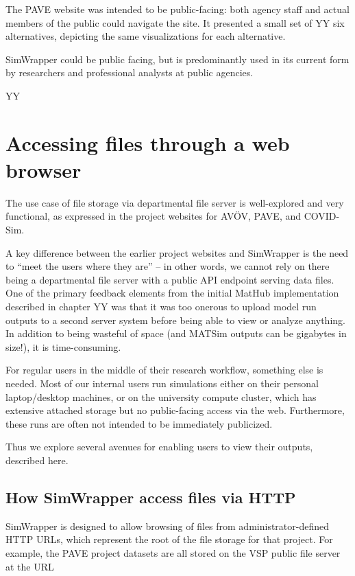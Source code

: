 The PAVE website was intended to be public-facing: both agency staff and
actual members of the public could navigate the site. It presented a
small set of YY six alternatives, depicting the same visualizations for
each alternative.

SimWrapper could be public facing, but is predominantly used in its
current form by researchers and professional analysts at public
agencies.

YY

\hypertarget{accessing-files-through-a-web-browser}{%
\section{Accessing files through a web
browser}\label{accessing-files-through-a-web-browser}}

The use case of file storage via departmental file server is
well-explored and very functional, as expressed in the project websites
for AVÖV, PAVE, and COVID-Sim.

A key difference between the earlier project websites and SimWrapper is
the need to ``meet the users where they are'' -- in other words, we
cannot rely on there being a departmental file server with a public API
endpoint serving data files. One of the primary feedback elements from
the initial MatHub implementation described in chapter YY was that it
was too onerous to upload model run outputs to a second server system
before being able to view or analyze anything. In addition to being
wasteful of space (and MATSim outputs can be gigabytes in size!), it is
time-consuming.

For regular users in the middle of their research workflow, something
else is needed. Most of our internal users run simulations either on
their personal laptop/desktop machines, or on the university compute
cluster, which has extensive attached storage but no public-facing
access via the web. Furthermore, these runs are often not intended to be
immediately publicized.

Thus we explore several avenues for enabling users to view their
outputs, described here.

\hypertarget{how-simwrapper-access-files-via-http}{%
\subsection{How SimWrapper access files via
HTTP}\label{how-simwrapper-access-files-via-http}}

SimWrapper is designed to allow browsing of files from
administrator-defined HTTP URLs, which represent the root of the file
storage for that project. For example, the PAVE project datasets are all
stored on the VSP public file server at the URL

